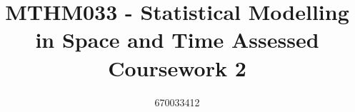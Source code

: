 \title{\vspace{-2.0cm}MTHM033 - Statistical Modelling in Space and Time \break 
Assessed Coursework 2}
\author{670033412}
\date{}
\maketitle